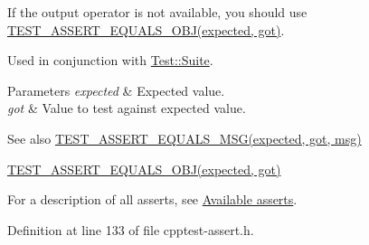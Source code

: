 If the output operator is not available, you should use \hyperlink{cpptest-assert_8h_aa506d98e8a5fc575df0361906f7deef8}{T\+E\+S\+T\+\_\+\+A\+S\+S\+E\+R\+T\+\_\+\+E\+Q\+U\+A\+L\+S\+\_\+\+O\+B\+J(expected, got)}.

Used in conjunction with \hyperlink{class_test_1_1_suite}{Test\+::\+Suite}.


\begin{DoxyParams}{Parameters}
{\em expected} & Expected value. \\
\hline
{\em got} & Value to test against expected value.\\
\hline
\end{DoxyParams}
\begin{DoxySeeAlso}{See also}
\hyperlink{cpptest-assert_8h_ab8e9ce729f96abe74b76d98f9568a59c}{T\+E\+S\+T\+\_\+\+A\+S\+S\+E\+R\+T\+\_\+\+E\+Q\+U\+A\+L\+S\+\_\+\+M\+S\+G(expected, got, msg)} 

\hyperlink{cpptest-assert_8h_aa506d98e8a5fc575df0361906f7deef8}{T\+E\+S\+T\+\_\+\+A\+S\+S\+E\+R\+T\+\_\+\+E\+Q\+U\+A\+L\+S\+\_\+\+O\+B\+J(expected, got)}
\end{DoxySeeAlso}
For a description of all asserts, see \hyperlink{asserts}{Available asserts}. 

Definition at line 133 of file cpptest-\/assert.\+h.

